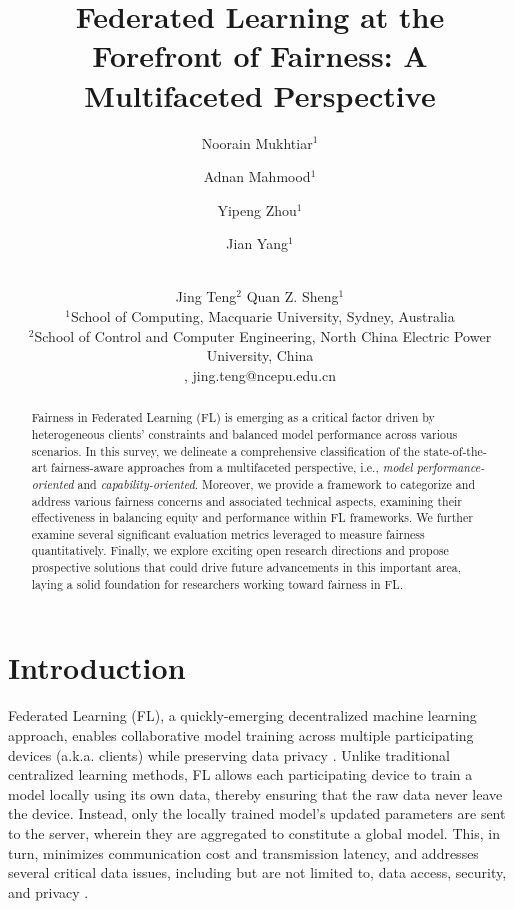\documentclass{article}
\title{Federated Learning at the Forefront of Fairness: A Multifaceted Perspective}
\author{
Noorain Mukhtiar$^1$
\and
Adnan Mahmood$^1$\and
Yipeng Zhou$^{1}$\and
Jian Yang$^{1}$\and \\
Jing Teng$^{2}$\And
Quan Z. Sheng$^{1}$\\
\affiliations
$^1$School of Computing,  
Macquarie University, Sydney, Australia\\
$^2$School of Control and Computer Engineering,  
North China Electric Power University, China\\
\emails{
noorain.mukhtiar@hdr.mq.edu.au, \{adnan.mahmood, yipeng.zhou, jian.yang, michael.sheng\}@mq.edu.au}, {jing.teng@ncepu.edu.cn}}
\begin{document}
\maketitle

\begin{abstract}
Fairness in Federated Learning (FL) is emerging as a critical factor driven by heterogeneous clients' constraints and balanced model performance across various scenarios. 
In this survey, we delineate a comprehensive classification of the state-of-the-art fairness-aware approaches from a multifaceted perspective, i.e., \emph{model performance-oriented} and \emph{capability-oriented}. Moreover, we provide a framework to categorize and address various fairness concerns and associated technical aspects, examining their effectiveness in balancing equity
and performance within FL frameworks. We further examine several significant evaluation metrics leveraged to measure fairness quantitatively. Finally, we explore exciting 
open research directions and propose prospective solutions that could drive future advancements in this important area, laying a solid foundation for researchers working toward fairness in FL.     

\end{abstract}

\section{Introduction}
Federated Learning (FL), a quickly-emerging decentralized machine learning approach, enables collaborative model training across multiple participating devices (a.k.a. clients) while preserving data privacy \cite{ijcai2024p919}. Unlike traditional centralized learning methods, FL allows each participating device to train a model locally using its own data, thereby ensuring that the raw data never leave the device. Instead, only the locally trained model's updated parameters are sent to the server, wherein they are aggregated to constitute a global model. This, in turn, minimizes communication cost and transmission latency, and addresses several critical data issues, including but are not limited to, data access, security, and privacy \cite{ijcai2023_survey}.
\end{document}
